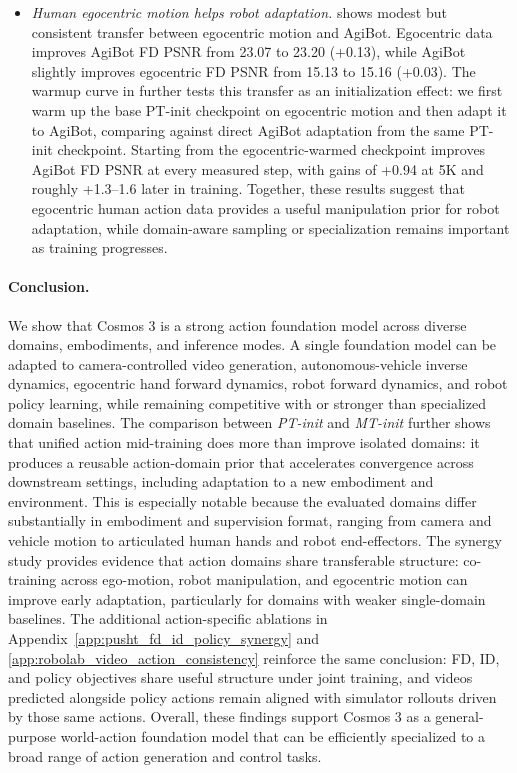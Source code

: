 \begin{itemize}[leftmargin=*]
    \item \textit{Human egocentric motion helps robot adaptation.}
     shows modest but consistent transfer between egocentric motion and AgiBot.
    Egocentric data improves AgiBot FD PSNR from 23.07 to 23.20 (+0.13), while AgiBot slightly improves egocentric FD PSNR from 15.13 to 15.16 (+0.03).
    The warmup curve in  further tests this transfer as an initialization effect: we first warm up the base PT-init checkpoint on egocentric motion and then adapt it to AgiBot, comparing against direct AgiBot adaptation from the same PT-init checkpoint.
    Starting from the egocentric-warmed checkpoint improves AgiBot FD PSNR at every measured step, with gains of +0.94 at 5K and roughly +1.3--1.6 later in training.
    Together, these results suggest that egocentric human action data provides a useful manipulation prior for robot adaptation, while domain-aware sampling or specialization remains important as training progresses.
\end{itemize}




\paragraph{Conclusion.}
\label{sec:action_exp_summary}
We show that Cosmos 3 is a strong action foundation model across diverse domains, embodiments, and inference modes.
A single foundation model can be adapted to camera-controlled video generation, autonomous-vehicle inverse dynamics, egocentric hand forward dynamics, robot forward dynamics, and robot policy learning, while remaining competitive with or stronger than specialized domain baselines.
The comparison between \textit{PT-init} and \textit{MT-init} further shows that unified action mid-training does more than improve isolated domains: it produces a reusable action-domain prior that accelerates convergence across downstream settings, including adaptation to a new embodiment and environment.
This is especially notable because the evaluated domains differ substantially in embodiment and supervision format, ranging from camera and vehicle motion to articulated human hands and robot end-effectors.
The synergy study provides evidence that action domains share transferable structure: co-training across ego-motion, robot manipulation, and egocentric motion can improve early adaptation, particularly for domains with weaker single-domain baselines.
The additional action-specific ablations in Appendix~\ref{app:pusht_fd_id_policy_synergy} and \ref{app:robolab_video_action_consistency} reinforce the same conclusion: FD, ID, and policy objectives share useful structure under joint training, and videos predicted alongside policy actions remain aligned with simulator rollouts driven by those same actions.
Overall, these findings support Cosmos 3 as a general-purpose world-action foundation model that can be efficiently specialized to a broad range of action generation and control tasks.
